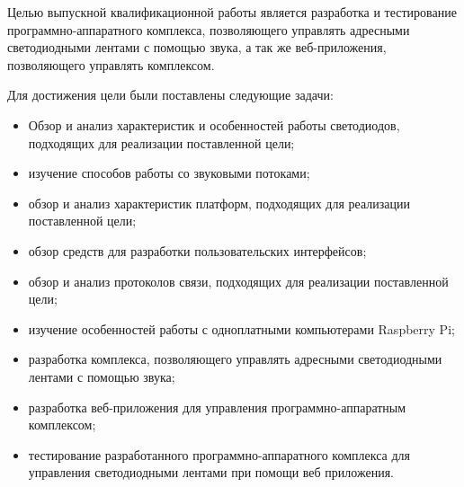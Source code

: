 Целью выпускной квалификационной работы является разработка и тестирование программно-аппаратного комплекса, позволяющего управлять адресными светодиодными лентами с помощью звука, а так же веб-приложения, позволяющего управлять комплексом.

Для достижения цели были поставлены следующие задачи:

\begin{itemize}
  \item Обзор и анализ характеристик и особенностей работы светодиодов, подходящих для реализации поставленной цели;
  \item изучение способов работы со звуковыми потоками;
  \item обзор и анализ характеристик платформ, подходящих для реализации поставленной цели;
  \item обзор средств для разработки пользовательских интерфейсов;
  \item обзор и анализ протоколов связи, подходящих для реализации поставленной цели;
  \item изучение особенностей работы с одноплатными компьютерами Raspberry Pi;
  \item разработка комплекса, позволяющего управлять адресными светодиодными лентами с помощью звука;
  \item разработка веб-приложения для управления программно-аппаратным комплексом;
  \item тестирование разработанного программно-аппаратного комплекса для управления светодиодными лентами при помощи веб приложения.
\end{itemize}